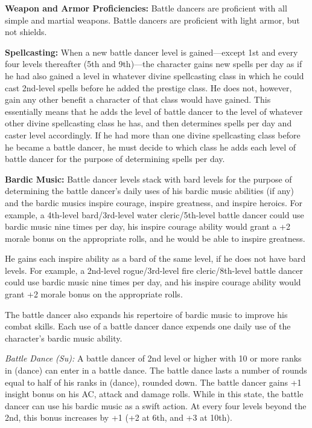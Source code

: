 {
\textbf{Weapon and Armor Proficiencies:} Battle dancers are proficient with all simple and martial weapons. Battle dancers are proficient with light armor, but not shields.

\textbf{Spellcasting:} When a new battle dancer level is gained---except 1st and every four levels thereafter (5th and 9th)---the character gains new spells per day as if he had also gained a level in whatever divine spellcasting class in which he could cast 2nd-level spells before he added the prestige class. He does not, however, gain any other benefit a character of that class would have gained. This essentially means that he adds the level of battle dancer to the level of whatever other divine spellcasting class he has, and then determines spells per day and caster level accordingly. If he had more than one divine spellcasting class before he became a battle dancer, he must decide to which class he adds each level of battle dancer for the purpose of determining spells per day.

\textbf{Bardic Music:} Battle dancer levels stack with bard levels for the purpose of determining the battle dancer's daily uses of his bardic music abilities (if any) and the bardic musics inspire courage, inspire greatness, and inspire heroics. For example, a 4th-level bard/3rd-level water cleric/5th-level battle dancer could use bardic music nine times per day, his inspire courage ability would grant a +2 morale bonus on the appropriate rolls, and he would be able to inspire greatness.

He gains each inspire ability as a bard of the same level, if he does not have bard levels. For example, a 2nd-level rogue/3rd-level fire cleric/8th-level battle dancer could use bardic music nine times per day, and his inspire courage ability would grant +2 morale bonus on the appropriate rolls.

The battle dancer also expands his repertoire of bardic music to improve his combat skills. Each use of a battle dancer dance expends one daily use of the character's bardic music ability.

\textit{Battle Dance (Su):} A battle dancer of 2nd level or higher with 10 or more ranks in  (dance) can enter in a battle dance. The battle dance lasts a number of rounds equal to half of his ranks in  (dance), rounded down. The battle dancer gains +1 insight bonus on his AC, attack and damage rolls. While in this state, the battle dancer can use his bardic music as a swift action. At every four levels beyond the 2nd, this bonus increases by +1 (+2 at 6th, and +3 at 10th).

}
